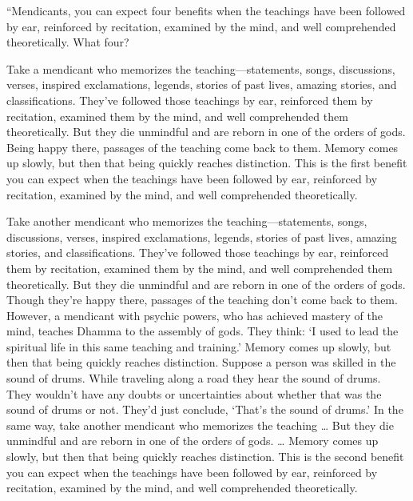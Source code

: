 \documentclass[12pt,openany]{book}%
\begin{document}
“Mendicants, you can expect four benefits when the teachings have been followed by ear, reinforced by recitation, examined by the mind, and well comprehended theoretically. What four? 

Take a mendicant who memorizes the teaching—statements, songs, discussions, verses, inspired exclamations, legends, stories of past lives, amazing stories, and classifications. They’ve followed those teachings by ear, reinforced them by recitation, examined them by the mind, and well comprehended them theoretically. But they die unmindful and are reborn in one of the orders of gods. Being happy there, passages of the teaching come back to them. Memory comes up slowly, but then that being quickly reaches distinction. This is the first benefit you can expect when the teachings have been followed by ear, reinforced by recitation, examined by the mind, and well comprehended theoretically. 

Take another mendicant who memorizes the teaching—statements, songs, discussions, verses, inspired exclamations, legends, stories of past lives, amazing stories, and classifications. They’ve followed those teachings by ear, reinforced them by recitation, examined them by the mind, and well comprehended them theoretically. But they die unmindful and are reborn in one of the orders of gods. Though they’re happy there, passages of the teaching don’t come back to them. However, a mendicant with psychic powers, who has achieved mastery of the mind, teaches Dhamma to the assembly of gods. They think: ‘I used to lead the spiritual life in this same teaching and training.’ Memory comes up slowly, but then that being quickly reaches distinction. Suppose a person was skilled in the sound of drums. While traveling along a road they hear the sound of drums. They wouldn’t have any doubts or uncertainties about whether that was the sound of drums or not. They’d just conclude, ‘That’s the sound of drums.’ In the same way, take another mendicant who memorizes the teaching … But they die unmindful and are reborn in one of the orders of gods. … Memory comes up slowly, but then that being quickly reaches distinction. This is the second benefit you can expect when the teachings have been followed by ear, reinforced by recitation, examined by the mind, and well comprehended theoretically. 
\end{document}
